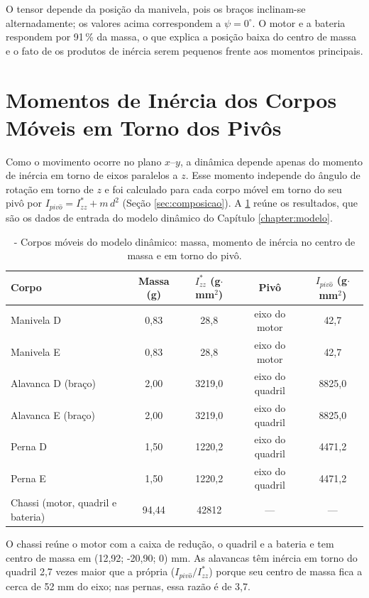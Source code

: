 \noindent O tensor depende da posição da manivela, pois os braços inclinam-se alternadamente; os valores acima correspondem a $\psi=0^\circ$. O motor e a bateria respondem por 91\,\% da massa, o que explica a posição baixa do centro de massa e o fato de os produtos de inércia serem pequenos frente aos momentos principais.

\section{Momentos de Inércia dos Corpos Móveis em Torno dos Pivôs}
\label{sec:corpos_moveis}

Como o movimento ocorre no plano $x$--$y$, a dinâmica depende apenas do momento de inércia em torno de eixos paralelos a $z$. Esse momento independe do ângulo de rotação em torno de $z$ e foi calculado para cada corpo móvel em torno do seu pivô por $I_{piv\hat{o}} = I^*_{zz} + m\,d^2$ (Seção \ref{sec:composicao}). A \ref{tab:corpos} reúne os resultados, que são os dados de entrada do modelo dinâmico do Capítulo \ref{chapter:modelo}.

\begin{table}[H]
\centering
\caption{\label{tab:corpos}- Corpos móveis do modelo dinâmico: massa, momento de inércia no centro de massa e em torno do pivô.}
\vspace*{.1cm}
\small
\begin{tabular}{|l|c|c|c|c|}
\hline
\textbf{Corpo} & \textbf{Massa (g)} & \textbf{$I^*_{zz}$ (g$\cdot$mm$^2$)} & \textbf{Pivô} & \textbf{$I_{piv\hat{o}}$ (g$\cdot$mm$^2$)} \\
\hline
Manivela D & 0,83 & 28,8 & eixo do motor & 42,7 \\
\hline
Manivela E & 0,83 & 28,8 & eixo do motor & 42,7 \\
\hline
Alavanca D (braço) & 2,00 & 3219,0 & eixo do quadril & 8825,0 \\
\hline
Alavanca E (braço) & 2,00 & 3219,0 & eixo do quadril & 8825,0 \\
\hline
Perna D & 1,50 & 1220,2 & eixo do quadril & 4471,2 \\
\hline
Perna E & 1,50 & 1220,2 & eixo do quadril & 4471,2 \\
\hline
Chassi (motor, quadril e bateria) & 94,44 & 42812 & --- & --- \\
\hline
\end{tabular}
\end{table}

O chassi reúne o motor com a caixa de redução, o quadril e a bateria e tem centro de massa em (12{,}92; -20{,}90; 0) mm. As alavancas têm inércia em torno do quadril 2,7 vezes maior que a própria ($I_{piv\hat{o}}/I^*_{zz}$) porque seu centro de massa fica a cerca de 52 mm do eixo; nas pernas, essa razão é de 3,7.
